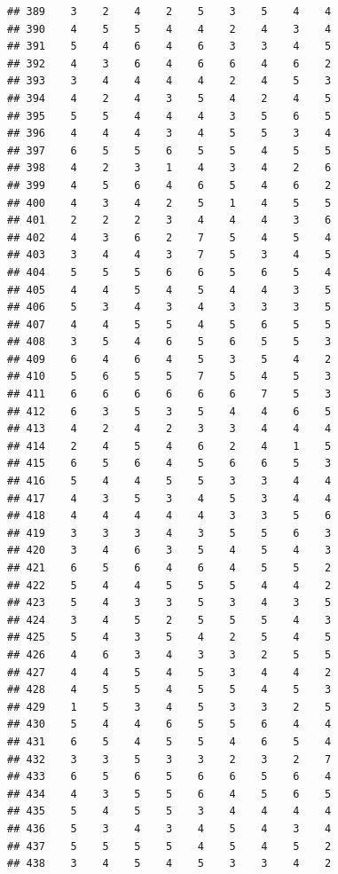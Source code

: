 \documentclass[
]{article}
\begin{document}
\begin{verbatim}
## 389    3    2    4    2    5    3    5    4    4
## 390    4    5    5    4    4    2    4    3    4
## 391    5    4    6    4    6    3    3    4    5
## 392    4    3    6    4    6    6    4    6    2
## 393    3    4    4    4    4    2    4    5    3
## 394    4    2    4    3    5    4    2    4    5
## 395    5    5    4    4    4    3    5    6    5
## 396    4    4    4    3    4    5    5    3    4
## 397    6    5    5    6    5    5    4    5    5
## 398    4    2    3    1    4    3    4    2    6
## 399    4    5    6    4    6    5    4    6    2
## 400    4    3    4    2    5    1    4    5    5
## 401    2    2    2    3    4    4    4    3    6
## 402    4    3    6    2    7    5    4    5    4
## 403    3    4    4    3    7    5    3    4    5
## 404    5    5    5    6    6    5    6    5    4
## 405    4    4    5    4    5    4    4    3    5
## 406    5    3    4    3    4    3    3    3    5
## 407    4    4    5    5    4    5    6    5    5
## 408    3    5    4    6    5    6    5    5    3
## 409    6    4    6    4    5    3    5    4    2
## 410    5    6    5    5    7    5    4    5    3
## 411    6    6    6    6    6    6    7    5    3
## 412    6    3    5    3    5    4    4    6    5
## 413    4    2    4    2    3    3    4    4    4
## 414    2    4    5    4    6    2    4    1    5
## 415    6    5    6    4    5    6    6    5    3
## 416    5    4    4    5    5    3    3    4    4
## 417    4    3    5    3    4    5    3    4    4
## 418    4    4    4    4    4    3    3    5    6
## 419    3    3    3    4    3    5    5    6    3
## 420    3    4    6    3    5    4    5    4    3
## 421    6    5    6    4    6    4    5    5    2
## 422    5    4    4    5    5    5    4    4    2
## 423    5    4    3    3    5    3    4    3    5
## 424    3    4    5    2    5    5    5    4    3
## 425    5    4    3    5    4    2    5    4    5
## 426    4    6    3    4    3    3    2    5    5
## 427    4    4    5    4    5    3    4    4    2
## 428    4    5    5    4    5    5    4    5    3
## 429    1    5    3    4    5    3    3    2    5
## 430    5    4    4    6    5    5    6    4    4
## 431    6    5    4    5    5    4    6    5    4
## 432    3    3    5    3    3    2    3    2    7
## 433    6    5    6    5    6    6    5    6    4
## 434    4    3    5    5    6    4    5    6    5
## 435    5    4    5    5    3    4    4    4    4
## 436    5    3    4    3    4    5    4    3    4
## 437    5    5    5    5    4    5    4    5    2
## 438    3    4    5    4    5    3    3    4    2

\end{verbatim}
\end{document}
